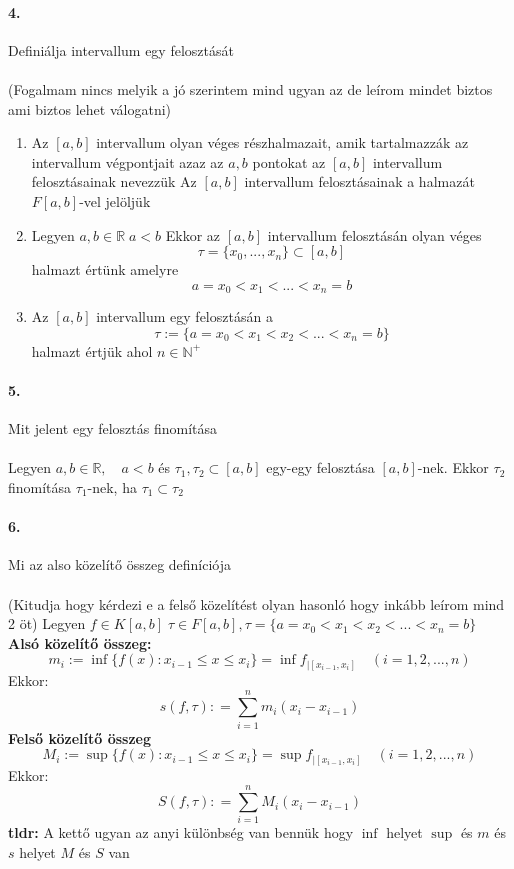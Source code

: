 \documentclass[10pt,a4paper]{article}
\newcommand{\R}{\mathbb{R}}
\renewcommand{\>}{\rightarrow}
\begin{document}
\paragraph{4.}
Definiálja intervallum egy felosztását \\\\
(Fogalmam nincs melyik a jó szerintem mind ugyan az de leírom mindet biztos ami biztos lehet válogatni) 
\begin{enumerate}
\item Az $[a,b]$ intervallum olyan véges részhalmazait, amik tartalmazzák az intervallum végpontjait azaz az $a,b$ pontokat az $[a,b]$ intervallum felosztásainak nevezzük 
Az $[a,b]$ intervallum felosztásainak a halmazát $F[a,b]$-vel jelöljük
\item Legyen $a,b \in \R \; a < b $ Ekkor az $[a,b]$ intervallum felosztásán olyan véges \[ \tau = \{ x_0,...,x_n\} \subset [a,b]\] halmazt értünk amelyre \[a = x_0<x_1<...<x_n = b\]
\item Az $[a,b]$ intervallum egy felosztásán a 
\[
\tau := \{a=x_0<x_1<x_2<...<x_n =b\}
\]  
halmazt értjük ahol $n\in \mathbb{N}^+$
\end{enumerate}
\paragraph{5.}
Mit jelent egy felosztás finomítása \\\\
Legyen $a,b \in \R, \quad a<b$ és $\tau_1 , \tau_2 \subset [a,b]$ egy-egy felosztása $[a,b]$-nek. Ekkor $\tau_2$ finomítása $\tau_1$-nek, ha $\tau_1 \subset \tau_2$
\paragraph{6.}
Mi az also közelítő összeg definíciója \\\\
(Kitudja hogy kérdezi e a felső közelítést olyan hasonló hogy inkább leírom mind 2 öt)
Legyen $f\in K[a,b] \; \tau \in F [a,b], \tau = \{a=x_0<x_1<x_2<...<x_n =b\}$ \\
\textbf{Alsó közelítő összeg:}
\[
m_i:= \inf \{ f(x) : x_{i-1} \leq x \leq x_i\} = \inf f_{\big\lvert [x_{i-1},x_i]} \quad (i=1,2,...,n) 
\]
Ekkor:
\[
s(f,\tau ): = \sum\limits_{i=1}^n m_i (x_i -x_{i-1}) 
\]
\textbf{Felső közelítő összeg}
\[
M_i:= \sup \{ f(x) : x_{i-1} \leq x \leq x_i\} = \sup f_{\big\lvert [x_{i-1},x_i]} \quad (i=1,2,...,n) 
\]
Ekkor:
\[
S(f,\tau ): = \sum\limits_{i=1}^n M_i (x_i -x_{i-1}) 
\]
\textbf{tldr:} A kettő ugyan az anyi különbség van bennük hogy $\inf$ helyet $\sup$ és $m$ és $s$ helyet $M$ és $S$ van
\newpage
\end{document}

